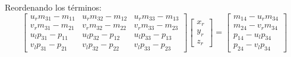 \begin{frame}
    Reordenando los términos:
    \begin{equation*}
        \begin{bmatrix}
            u_r m_{31} - m_{11} & u_r m_{32} - m_{12} & u_r m_{33} - m_{13} \\
            v_r m_{31} - m_{21} & v_r m_{32} - m_{22} & v_r m_{33} - m_{23} \\
            u_l p_{31} - p_{11} & u_l p_{32} - p_{12} & u_l p_{33} - p_{13} \\
            v_l p_{31} - p_{21} & v_l p_{32} - p_{22} & v_l p_{33} - p_{23}
        \end{bmatrix}
        \begin{bmatrix} x_r \\ y_r \\ z_r \end{bmatrix} =
        \begin{bmatrix}
            m_{14} - u_r m_{34} \\
            m_{24} - v_r m_{34} \\
            p_{14} - u_l p_{34} \\
            p_{24} - v_l p_{34}
    \end{bmatrix}
    \end{equation*}
\end{frame}

